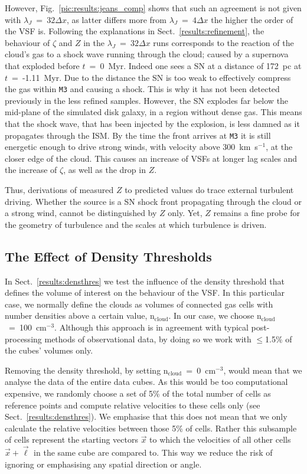 However, Fig.~\ref{pic:results:jeans_comp} shows that such an agreement is not given with $\lambda_J$~=~$32\Delta{}x$, as latter differs more from $\lambda_J$~=~$4\Delta{}x$ the higher the order of the VSF is.
Following the explanations in Sect.~\ref{results:refinement}, the behaviour of $\zeta$ and $Z$ in the $\lambda_J$~=~$32\Delta{}x$ runs corresponds to the reaction of the cloud's gas to a shock wave running through the cloud; caused by a supernova that exploded before $t$~=~0~Myr. 
Indeed one sees a SN at a distance of 172~pc at $t$~=~-1.11~Myr. 
Due to the distance the SN is too weak to effectively compress the gas within \texttt{M3} and causing a shock.
This is why it has not been detected previously in the less refined samples.
However, the SN explodes far below the mid-plane of the simulated disk galaxy, in a region without dense gas.
This means that the shock wave, that has been injected by the explosion, is less damned as it propagates through the ISM. 
By the time the front arrives at \texttt{M3} it is still energetic enough to drive strong winds, with velocity above 300~km~s$^{-1}$, at the closer edge of the cloud. 
This causes an increase of VSFs at longer lag scales and the increase of $\zeta$, as well as the drop in $Z$.

Thus, derivations of measured $Z$ to predicted values do trace external turbulent driving.
Whether the source is a SN shock front propagating through the cloud or a strong wind, cannot be distinguished by $Z$ only. 
Yet, $Z$ remains a fine probe for the geometry of turbulence and the scales at which turbulence is driven.




\subsection{The Effect of Density Thresholds}\label{discussion:densthres}

In Sect.~\ref{results:densthres} we test the influence of the density threshold that defines the volume of interest on the behaviour of the VSF.
In this particular case, we normally define the clouds as volumes of connected gas cells with number densities above a certain value, n$_\mathrm{cloud}$.
In our case, we choose n$_\mathrm{cloud}$~=~100~cm$^{-3}$.
Although this approach is in agreement with typical post-processing methods of observational data, by doing so we work with $\leq$1.5\% of the cubes' volumes only.

Removing the density threshold, by setting n$_\mathrm{cloud}$~=~0~cm$^{-3}$, would mean that we analyse the data of the entire data cubes.
As this would be too computational expensive, we randomly choose a set of 5\% of the total number of cells as reference points and compute relative velocities to these cells only (see Sect.~\ref{results:densthres}).
We emphasise that this does not mean that we only calculate the relative velocities between those 5\% of cells.
Rather this subsample of cells represent the starting vectors $\vec{x}$ to which the velocities of all other cells  $\vec{x} + \vec{\ell}$ in the same cube are compared to.
This way we reduce the risk of ignoring or emphasising any spatial direction or angle.

